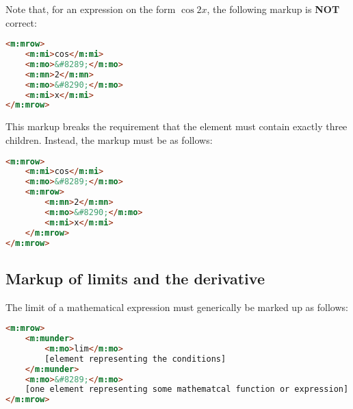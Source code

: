 \documentclass[english,a4paper,11pt]{article}
\begin{document}
Note that, for an expression on the form $\cos 2 x$, the following markup is \textbf{NOT} correct:
\begin{lstlisting}[language=HTML]
<m:mrow>
	<m:mi>cos</m:mi>
	<m:mo>&#8289;</m:mo>
	<m:mn>2</m:mn>
	<m:mo>&#8290;</m:mo>
	<m:mi>x</m:mi>
</m:mrow>
\end{lstlisting}
This markup breaks the requirement that the  element must contain exactly three children. Instead, the markup must be as follows:
\begin{lstlisting}[language=HTML]
<m:mrow>
	<m:mi>cos</m:mi>
	<m:mo>&#8289;</m:mo>
	<m:mrow>
		<m:mn>2</m:mn>
		<m:mo>&#8290;</m:mo>
		<m:mi>x</m:mi>
	</m:mrow>
</m:mrow>
\end{lstlisting}

\subsection{Markup of limits and the derivative}

The limit of a mathematical expression must generically be marked up as follows:
\begin{lstlisting}[language=HTML]
<m:mrow>
	<m:munder>
		<m:mo>lim</m:mo>
		[element representing the conditions]
	</m:munder>
	<m:mo>&#8289;</m:mo>
	[one element representing some mathematcal function or expression]
</m:mrow>
\end{lstlisting}

\end{document}
